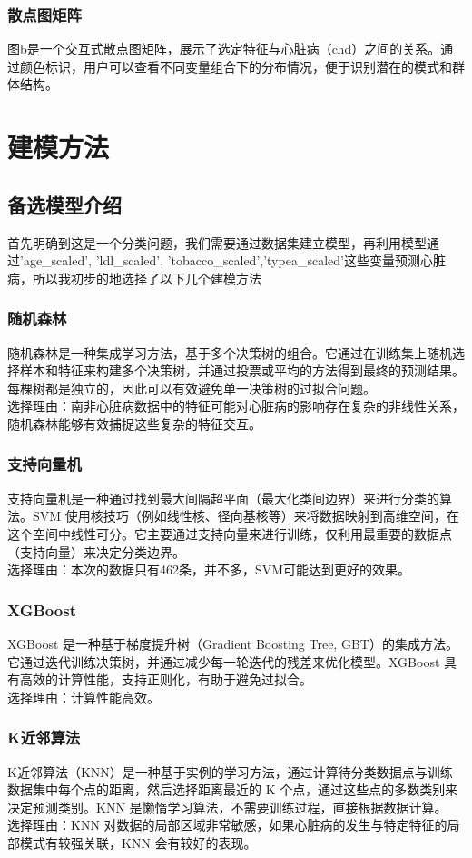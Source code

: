 \documentclass[UTF8]{article}
\begin{document}
	\subsubsection{散点图矩阵}
 图b是一个交互式散点图矩阵，展示了选定特征与心脏病（chd）之间的关系。通过颜色标识，用户可以查看不同变量组合下的分布情况，便于识别潜在的模式和群体结构。
	\section{建模方法}
	\subsection{备选模型介绍}
	首先明确到这是一个分类问题，我们需要通过数据集建立模型，再利用模型通过'age\_scaled', 'ldl\_scaled', 'tobacco\_scaled','typea\_scaled'这些变量预测心脏病，所以我初步的地选择了以下几个建模方法
	\subsubsection{随机森林}
	随机森林是一种集成学习方法，基于多个决策树的组合。它通过在训练集上随机选择样本和特征来构建多个决策树，并通过投票或平均的方法得到最终的预测结果。每棵树都是独立的，因此可以有效避免单一决策树的过拟合问题。\\
	选择理由：南非心脏病数据中的特征可能对心脏病的影响存在复杂的非线性关系，随机森林能够有效捕捉这些复杂的特征交互。
	\subsubsection{支持向量机}
	 支持向量机是一种通过找到最大间隔超平面（最大化类间边界）来进行分类的算法。SVM 使用核技巧（例如线性核、径向基核等）来将数据映射到高维空间，在这个空间中线性可分。它主要通过支持向量来进行训练，仅利用最重要的数据点（支持向量）来决定分类边界。\\
	 选择理由：本次的数据只有462条，并不多，SVM可能达到更好的效果。
	\subsubsection{XGBoost}
	XGBoost 是一种基于梯度提升树（Gradient Boosting Tree, GBT）的集成方法。它通过迭代训练决策树，并通过减少每一轮迭代的残差来优化模型。XGBoost 具有高效的计算性能，支持正则化，有助于避免过拟合。\\
	选择理由：计算性能高效。
	\subsubsection{K近邻算法}
	K近邻算法（KNN）是一种基于实例的学习方法，通过计算待分类数据点与训练数据集中每个点的距离，然后选择距离最近的 K 个点，通过这些点的多数类别来决定预测类别。KNN 是懒惰学习算法，不需要训练过程，直接根据数据计算。\\
	选择理由：KNN 对数据的局部区域非常敏感，如果心脏病的发生与特定特征的局部模式有较强关联，KNN 会有较好的表现。
\end{document}
